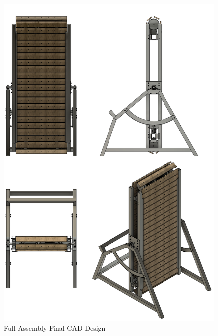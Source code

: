 \begin{figure}[ht]
    \centering
    \includegraphics[width=1.0\linewidth]{figs/final_design/Main_Assembly_CAD.pdf}
    \caption{Full Assembly Final CAD Design}
    \label{fig:full-assembly-final-design}
\end{figure}

